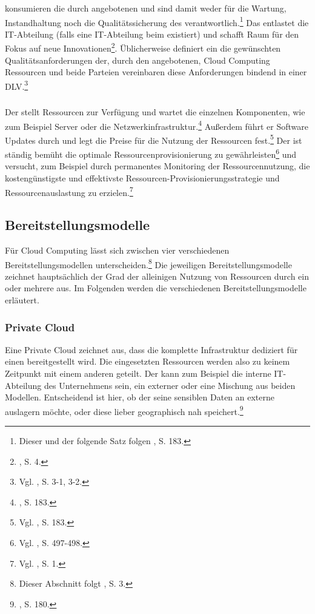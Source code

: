 \subsubsection{\CSU}
\CSU konsumieren die durch \CSP angebotenen \CSs und sind damit weder für die Wartung, Instandhaltung noch die Qualitätssicherung des \CSs verantwortlich.\footnote{Dieser und der folgende Satz folgen \cite{Marston.2011}, S. 183.} Das entlastet die IT-Abteilung (falls eine IT-Abteilung beim \CSU existiert) und schafft Raum für den Fokus auf neue Innovationen\footnote{\cite{Boss.2007}, S. 4.}.
Üblicherweise definiert ein \CSU die gewünschten Qualitätsanforderungen der, durch den \CSP angebotenen, Cloud Computing Ressourcen und beide Parteien vereinbaren diese Anforderungen bindend in einer \acf{DLV}.\footnote{Vgl. \cite{Badger.2011}, S. 3-1, 3-2.}

\subsubsection{\CSP}
Der \CSP stellt \CC Ressourcen zur Verfügung und wartet die einzelnen Komponenten, wie zum Beispiel Server oder die Netzwerkinfrastruktur.\footnote{\cite{Marston.2011}, S. 183.}
Außerdem führt er Software Updates durch und legt die Preise für die Nutzung der Ressourcen fest.\footnote{Vgl. \cite{Marston.2011}, S. 183.} 
Der \CSP ist ständig bemüht die optimale Ressourcenprovisionierung zu gewährleisten\footnote{Vgl. \cite{Zhu.2012}, S. 497-498.}
und versucht, zum Beispiel durch permanentes Monitoring der Ressourcennutzung, die kostengünstigste und effektivste Ressourcen-Provisionierungsstrategie und Ressourcenauslastung zu erzielen.\footnote{Vgl. \cite{Meng.2012}, S. 1.}

\subsection{Bereitstellungsmodelle}
\label{sec:Bereitstellungsmodelle}
Für Cloud Computing lässt sich zwischen vier verschiedenen Bereitstellungsmodellen unterscheiden.\footnote{Dieser Abschnitt folgt \cite{Mell.2011}, S. 3.} Die jeweiligen Bereitstellungsmodelle zeichnet hauptsächlich der Grad der alleinigen Nutzung von Ressourcen durch ein oder mehrere \CSU aus. Im Folgenden werden die verschiedenen Bereitstellungsmodelle erläutert.

\subsubsection{Private Cloud}
\label{sec:PrivateCloud}
Eine Private Cloud zeichnet aus, dass die komplette \CC Infrastruktur dediziert für einen \CSU bereitgestellt wird. Die eingesetzten Ressourcen werden also zu keinem Zeitpunkt mit einem anderen \CSU geteilt. Der \CSP kann zum Beispiel die interne IT-Abteilung des Unternehmens sein, ein externer \CSP oder eine Mischung aus beiden Modellen. Entscheidend ist hier, ob der \CSU seine sensiblen Daten an externe \CSP auslagern möchte, oder diese lieber geographisch nah speichert.\footnote{\cite{Marston.2011}, S. 180.}

